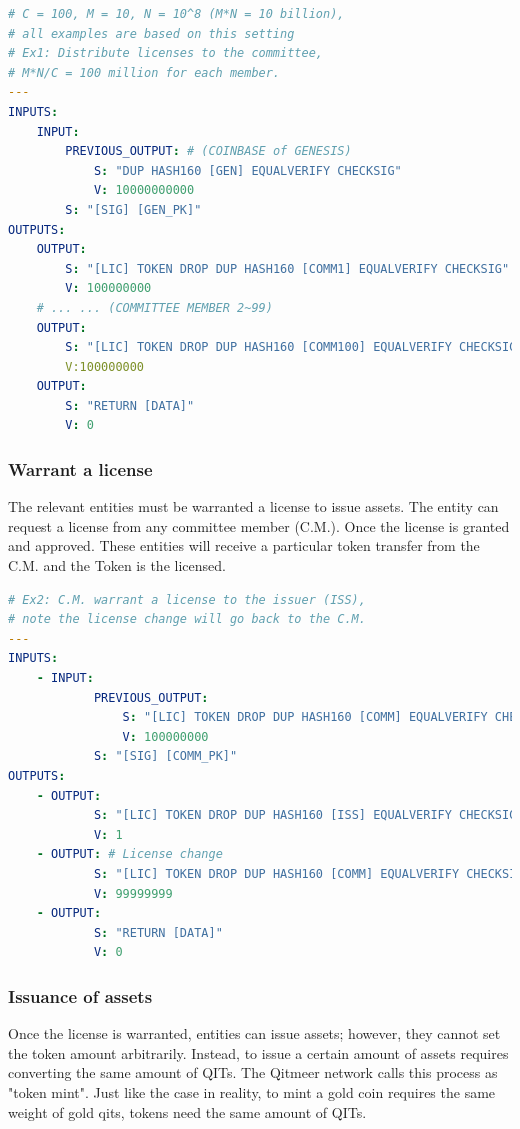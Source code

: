 \documentclass[a4paper,11pt]{article}
\begin{document}
\begin{lstlisting}[language=yaml, numbers=none,basicstyle=\footnotesize]
# C = 100, M = 10, N = 10^8 (M*N = 10 billion),
# all examples are based on this setting
# Ex1: Distribute licenses to the committee,
# M*N/C = 100 million for each member.
---
INPUTS:
	INPUT:
		PREVIOUS_OUTPUT: # (COINBASE of GENESIS)
			S: "DUP HASH160 [GEN] EQUALVERIFY CHECKSIG"
			V: 10000000000
		S: "[SIG] [GEN_PK]"
OUTPUTS:
	OUTPUT:
		S: "[LIC] TOKEN DROP DUP HASH160 [COMM1] EQUALVERIFY CHECKSIG"
		V: 100000000
	# ... ... (COMMITTEE MEMBER 2~99)
	OUTPUT:
		S: "[LIC] TOKEN DROP DUP HASH160 [COMM100] EQUALVERIFY CHECKSIG"
		V:100000000
	OUTPUT:
		S: "RETURN [DATA]"
		V: 0
\end{lstlisting}



\subsubsection{Warrant a license}

The relevant entities must be warranted a license to issue assets. The entity can request a license from any committee member (C.M.). Once the license is granted and approved. These entities will receive a particular token transfer from the C.M. and the Token is the licensed.

\lstset{basicstyle=\tiny,style=myListStyle}
\begin{lstlisting}[language=yaml, numbers=none,basicstyle=\footnotesize]
# Ex2: C.M. warrant a license to the issuer (ISS),
# note the license change will go back to the C.M.
---
INPUTS:
	- INPUT:
			PREVIOUS_OUTPUT:
				S: "[LIC] TOKEN DROP DUP HASH160 [COMM] EQUALVERIFY CHECKSIG"
				V: 100000000
			S: "[SIG] [COMM_PK]"
OUTPUTS:
	- OUTPUT:
			S: "[LIC] TOKEN DROP DUP HASH160 [ISS] EQUALVERIFY CHECKSIG"
			V: 1
	- OUTPUT: # License change
			S: "[LIC] TOKEN DROP DUP HASH160 [COMM] EQUALVERIFY CHECKSIG"
			V: 99999999
	- OUTPUT:
			S: "RETURN [DATA]"
			V: 0
\end{lstlisting}

\subsubsection{Issuance of assets}
Once the license is warranted, entities can issue assets; however, they cannot set the token amount arbitrarily. Instead, to issue a certain amount of assets requires converting the same amount of QITs. The Qitmeer network calls this process as "token mint". Just like the case in reality, to mint a gold coin requires the same weight of gold qits, tokens need the same amount of QITs.
\end{document}
